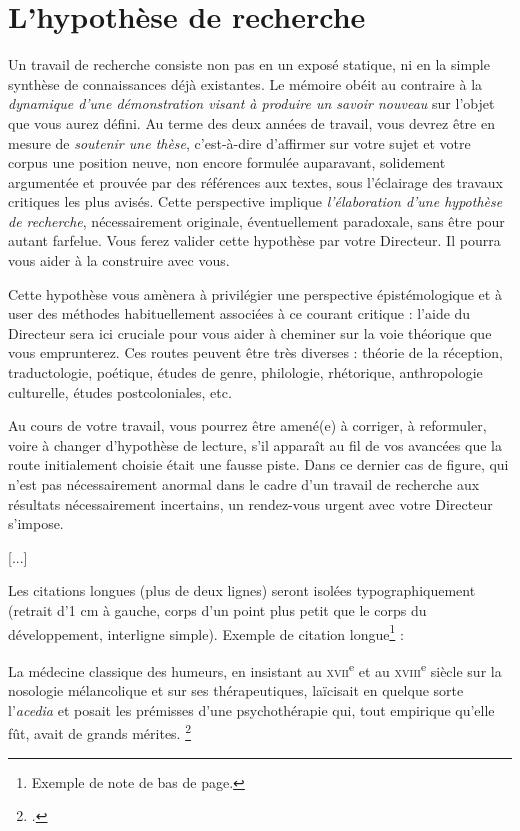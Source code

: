 \documentclass[12pt,twoside,final,openright]{book}
\makeatletter
\renewenvironment*{displayquote}
{\begingroup\setlength{\leftmargini}{1cm}\csq@getcargs{\csq@bdquote{}{}}}
{\csq@edquote\endgroup}
\makeatother
\begin{document}
\section{L'hypothèse de recherche}
Un travail de recherche consiste non pas en un exposé statique, ni en la simple synthèse de connaissances déjà existantes. Le mémoire obéit au contraire à la \textit{dynamique d’une démonstration visant à produire un savoir nouveau} sur l’objet que vous aurez défini. Au terme des deux années de travail, vous devrez être en mesure de \textit{soutenir une thèse}, c’est-à-dire d’affirmer sur votre sujet et votre corpus une position neuve, non encore formulée auparavant, solidement argumentée et prouvée par des références aux textes, sous l’éclairage des travaux critiques les plus avisés.
Cette perspective implique \textit{l’élaboration d’une hypothèse de recherche}, nécessairement originale, éventuellement paradoxale, sans être pour autant farfelue. Vous ferez valider cette hypothèse par votre Directeur. Il pourra vous aider à la construire avec vous.

Cette hypothèse vous amènera à privilégier une perspective épistémologique et à user des méthodes habituellement associées à ce courant critique : l’aide du Directeur sera ici cruciale pour vous aider à cheminer sur la voie théorique que vous emprunterez. Ces routes peuvent être très diverses : théorie de la réception, traductologie, poétique, études de genre, philologie, rhétorique, anthropologie culturelle, études postcoloniales, etc.

Au cours de votre travail, vous pourrez être amené(e) à corriger, à reformuler, voire à changer d’hypothèse de lecture, s’il apparaît au fil de vos avancées que la route initialement choisie était une fausse piste. Dans ce dernier cas de figure, qui n’est pas nécessairement anormal dans le cadre d’un travail de recherche aux résultats nécessairement incertains, un rendez-vous urgent avec votre Directeur s’impose.

[...]

Les citations longues (plus de deux lignes) seront isolées typographiquement (retrait d’1 cm à gauche, corps d’un point plus petit que le corps du développement, interligne simple). Exemple de citation longue\footnote{Exemple de note de bas de page.} :

\begin{displayquote}
La médecine classique des humeurs, en insistant au \textsc{xvii}\textsuperscript{e}  et au \textsc{xviii}\textsuperscript{e} siècle sur la nosologie mélancolique et sur ses thérapeutiques, laïcisait en quelque sorte l’\textit{acedia} et posait les prémisses d’une psychothérapie qui, tout empirique qu’elle fût, avait de grands mérites. \footcite{Mesnard1990}

\end{displayquote}

\clearpage
\printbibliography
\clearpage

\clearpage
\tableofcontents
\clearpage
\end{document}
